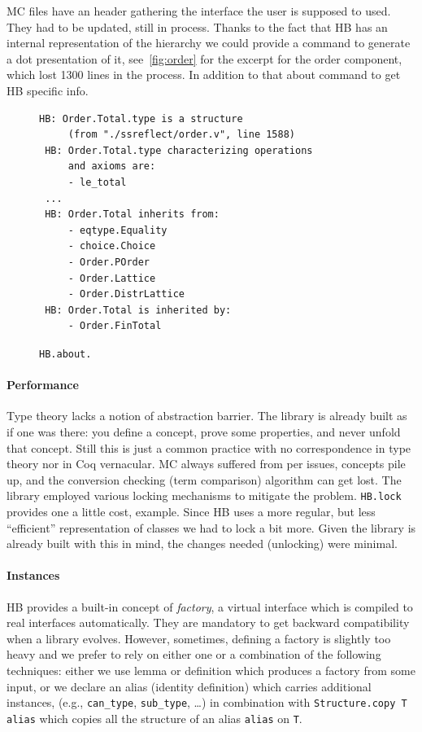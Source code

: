 \documentclass{easychair}
\def\MC{{\sf MC}}
\def\HB{{\sf HB}}
\def\newterm#1{{\it #1}}
\begin{document}
\MC{} files have an header gathering the interface the user is supposed to used.
They had to be updated, still in process. Thanks to the fact that \HB{} has an
internal representation of the hierarchy we could provide a command to
generate a dot presentation of it, see~\ref{fig:order} for the excerpt for the
order component, which lost 1300 lines in the process. In addition to that about command to get \HB{}
specific info.

\begin{figure}
\vspace{-1em}
\begin{Verbatim}[fontsize=\footnotesize]
 HB: Order.Total.type is a structure
     (from "./ssreflect/order.v", line 1588)
 HB: Order.Total.type characterizing operations
     and axioms are:
     - le_total
 ...
 HB: Order.Total inherits from:
     - eqtype.Equality
     - choice.Choice
     - Order.POrder
     - Order.Lattice
     - Order.DistrLattice
 HB: Order.Total is inherited by:
     - Order.FinTotal
\end{Verbatim}
\vspace{-1.5em}
\caption{\small {\tt HB.about.}}
\label{fig:orderabout}
\end{figure}

\paragraph{Performance}

Type theory lacks a notion of abstraction barrier. The library is already built
as if one was there: you define a concept, prove some properties, and never
unfold that concept. Still this is just a common practice with no correspondence
in type theory nor in Coq vernacular. \MC{} always suffered from per issues, concepts pile up,
and the conversion checking (term comparison) algorithm can get lost. The
library employed various locking mechanisms to mitigate the problem. \verb+HB.lock+
provides one a little cost, example.
Since \HB{} uses a more regular, but less ``efficient'' representation of classes
we had to lock a bit more. Given the library is already built with this in mind,
the changes needed (unlocking) were minimal.

\paragraph{Instances}

\HB{} provides a built-in concept of \newterm{factory}, a virtual interface which is
compiled to real interfaces automatically. They are mandatory to get backward
compatibility when a library evolves. However, sometimes, defining a factory is
slightly too heavy and we prefer to rely on either one or a combination of the
following techniques: either we use lemma or definition which produces a
factory from some input, or we declare an alias (identity definition) which
carries additional instances, (e.g., \verb+can_type+, \verb+sub_type+, \ldots) in
combination with \verb+Structure.copy T alias+ which copies all the structure
of an alias \verb+alias+ on \verb+T+.
\end{document}

